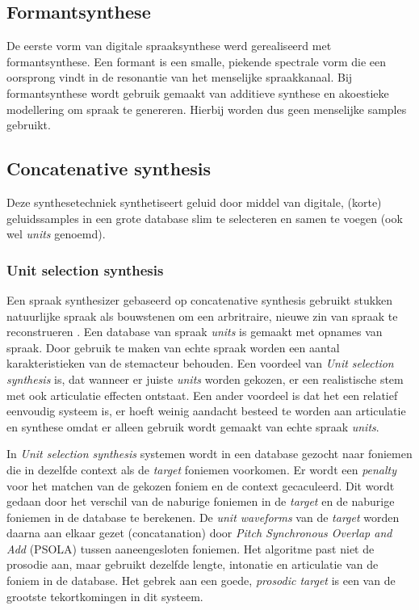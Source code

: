\subsection{Formantsynthese}
De eerste vorm van digitale spraaksynthese werd gerealiseerd met formantsynthese. Een formant is een smalle, piekende spectrale vorm die een oorsprong vindt in de resonantie van het menselijke spraakkanaal. Bij formantsynthese wordt gebruik gemaakt van additieve synthese en akoestieke modellering om spraak te genereren. Hierbij worden dus geen menselijke samples gebruikt.

\subsection{Concatenative synthesis}
Deze synthesetechniek synthetiseert geluid door middel van digitale, (korte) geluidssamples in een grote database slim te selecteren en samen te voegen (ook wel \textit{units} genoemd).

\subsubsection{Unit selection synthesis}
Een spraak synthesizer gebaseerd op concatenative synthesis gebruikt stukken natuurlijke spraak als bouwstenen om een arbritraire, nieuwe zin van spraak te reconstrueren \cite{nuance}. Een database van spraak \textit{units} is gemaakt met opnames van spraak. Door gebruik te maken van echte spraak worden een aantal karakteristieken van de stemacteur behouden. Een voordeel van \textit{Unit selection synthesis} is, dat wanneer er juiste \textit{units} worden gekozen, er een realistische stem met ook articulatie effecten ontstaat. Een ander voordeel is dat het een relatief eenvoudig systeem is, er hoeft weinig aandacht besteed te worden aan articulatie en synthese omdat er alleen gebruik wordt gemaakt van echte spraak \textit{units}.

In \textit{Unit selection synthesis} systemen wordt in een database gezocht naar foniemen die in dezelfde context als de \textit{target} foniemen voorkomen. Er wordt een \textit{penalty} voor het matchen van de gekozen foniem en de context gecaculeerd. Dit wordt gedaan door het verschil van de naburige foniemen in de \textit{target} en de naburige foniemen in de database te berekenen. De \textit{unit waveforms} van de \textit{target} worden daarna aan elkaar gezet (concatanation) door \textit{Pitch Synchronous Overlap and Add} (PSOLA) tussen aaneengesloten foniemen. Het algoritme past niet de prosodie aan, maar gebruikt dezelfde lengte, intonatie en articulatie van de foniem in de database. Het gebrek aan een goede, \textit{prosodic target} is een van de grootste tekortkomingen in dit systeem.

